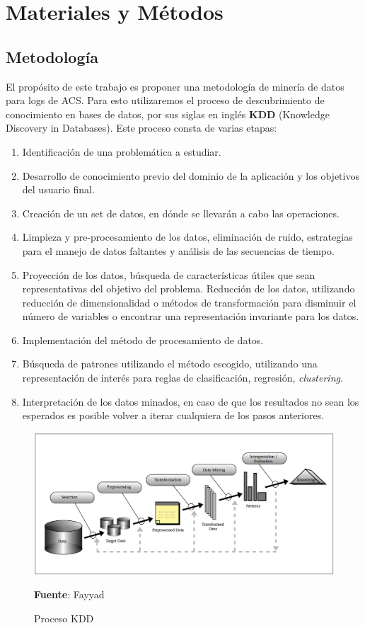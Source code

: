 \section{Materiales y Métodos}

\subsection{Metodología}
 
 El propósito de este trabajo es proponer una metodología de minería de datos para logs de ACS. Para esto utilizaremos el proceso de descubrimiento de conocimiento en bases de datos\cite{Fayyad1996}, por sus siglas en inglés \textbf{KDD} (Knowledge Discovery in Databases). Este proceso consta de varias etapas:
 
\begin{enumerate}
	\item Identificación de una problemática a estudiar.
	\item Desarrollo de conocimiento previo del dominio de la aplicación y los objetivos del usuario final.
	\item Creación de un set de datos, en dónde se llevarán a cabo las operaciones.
	\item Limpieza y pre-procesamiento de los datos, eliminación de ruido, estrategias para el manejo de datos faltantes y análisis de las secuencias de tiempo.
	\item Proyección de los datos, búsqueda de características útiles que sean representativas del objetivo del problema. Reducción de los datos, utilizando reducción de dimensionalidad o métodos de transformación para disminuir el número de variables o encontrar una representación invariante para los datos.
	\item Implementación del método de procesamiento de datos.
	\item Búsqueda de patrones utilizando el método escogido, utilizando una representación de interés para reglas de clasificación, regresión, \textit{clustering}.
	\item Interpretación de los datos minados, en caso de que los resultados no sean los esperados es posible volver a iterar cualquiera de los pasos anteriores.
\end{enumerate}


\begin{figure}[H]
\centering
\includegraphics[scale=0.22]{img/kdd}
\caption{Proceso KDD}
\textbf{Fuente}: Fayyad \cite{Fayyad1996}
\end{figure}	


